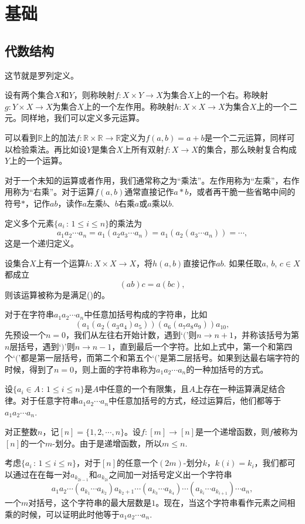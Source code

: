 \chapter{基础}

\section{代数结构}

这节就是罗列定义。

\para 设有两个集合$X$和$Y$，则称映射$f:X\times Y \to X$为集合$X$上的一个右。称映射$g:Y\times X \to X$为集合$X$上的一个左作用。称映射$h:X\times X \to X$为集合$X$上的一个二元。同样地，我们可以定义多元运算。

可以看到$\mathbb{R}$上的加法$f:\mathbb{R}\times \mathbb{R} \to \mathbb{R}$定义为$f(a,b)=a+b$是一个二元运算，同样可以检验乘法。再比如设$Y$是集合$X$上所有双射$f:X\to X$的集合，那么映射复合构成$Y$上的一个运算。

对于一个未知的运算或者作用，我们通常称之为“乘法”。左作用称为“左乘”，右作用称为“右乘”。对于运算$f(a,b)$通常直接记作$a*b$，或者再干脆一些省略中间的符号$*$，记作$ab$，读作$a$左乘$b$、$b$右乘$a$或$a$乘以$b$.

定义多个元素$\{a_i\,:\, 1\leq i \leq n\}$的乘法为
\[
	a_1a_2\cdots a_n=a_1(a_2a_3\cdots a_n)=a_1(a_2(a_3\cdots a_n))=\cdots,
\]
这是一个递归定义。

\para 设集合$X$上有一个运算$h:X\times X \to X$，将$h(a,b)$直接记作$ab$. 如果任取$a$, $b$, $c\in X$都成立
\[
	(ab)c=a(bc),
\]
则该运算被称为是满足()的。

\para 对于在字符串$a_1a_2\cdots a_n$中任意加括号构成的字符串，比如
\[
(a_1(a_2(a_3a_4)a_5))(a_6(a_7a_8a_9))a_{10},
\]
先预设一个$n=0$，我们从左往右开始计数，遇到`$($'则$n\to n+1$，并称该括号为第$n$层括号，遇到`$)$'则$n\to n-1$，直到最后一个字符。比如上式中，第一个和第四个`$($'都是第一层括号，而第二个和第五个`$($'是第二层括号。如果到达最右端字符的时候，得到了$n=0$，则上面的字符串称为$a_1a_2\cdots a_n$的一种加括号的方式。

\pro 设$\{a_i\in A\,:\, 1\leq i\leq n\}$是$A$中任意的一个有限集，且$A$上存在一种运算满足结合律。对于任意字符串$a_1a_2\cdots a_n$中任意加括号的方式，经过运算后，他们都等于$a_1a_2\cdots a_n$.

\proof 对正整数$n$，记$[n]=\{1,2,\cdots,n\}$。设$f:[m]\to [n]$是一个递增函数，则$f$被称为$[n]$的一个$m$-划分。由于是递增函数，所以$m\leq n$. 

考虑$\{a_i\, :\, 1\leq i\leq n\}$，对于$[n]$的任意一个$(2m)$-划分$k$，$k(i)=k_i$，我们都可以通过在在每一对$a_{k_{2i-1}}$和$a_{k_{2i}}$之间加一对括号定义出一个字符串
\[
	a_1a_2\cdots (a_{k_1}\cdots a_{k_2})a_{k_2+1}\cdots (a_{k_3}\cdots a_{k_4})\cdots (a_{k_i}\cdots a_{k_{i+1}})\cdots a_n,
\]
一个$m$对括号，这个字符串的最大层数是$1$。现在，当这个字符串看作元素之间相乘的时候，可以证明此时他等于$a_1a_2\cdots a_n$.


